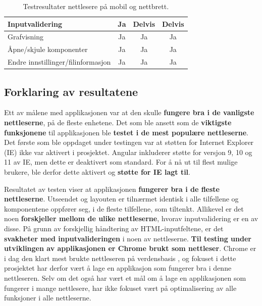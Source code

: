 \begin{table}[H]
{\begin{tabular}{|l|c|c|c|}
Inputvalidering & 
\cellcolor[HTML]{2ECC40}Ja & 
\cellcolor[HTML]{FFDC00}Delvis &
\cellcolor[HTML]{FFDC00}Delvis \\ \hline

Grafvisning & 
\cellcolor[HTML]{2ECC40}Ja & 
\cellcolor[HTML]{2ECC40}Ja & 
\cellcolor[HTML]{2ECC40}Ja \\ \hline

Åpne/skjule komponenter & 
\cellcolor[HTML]{2ECC40}Ja & 
\cellcolor[HTML]{2ECC40}Ja & 
\cellcolor[HTML]{2ECC40}Ja \\ \hline

Endre innstillinger/filinformasjon & 
\cellcolor[HTML]{2ECC40}Ja & 
\cellcolor[HTML]{2ECC40}Ja & 
\cellcolor[HTML]{2ECC40}Ja \\ \hline
\end{tabular}
}
\caption{Testresultater nettlesere på mobil og nettbrett.}
\end{table}

\subsection{Forklaring av resultatene}
Ett av målene med applikasjonen var at den skulle \textbf{fungere bra i de vanligste nettleserne}, på de fleste enhetene. Det som ble ansett som de \textbf{viktigste funksjonene} til applikasjonen ble \textbf{testet i de mest populære nettleserne}. Det første som ble oppdaget under testingen var at støtten for Internet Explorer (IE) ikke var aktivert i prosjektet. Angular inkluderer støtte for versjon 9, 10 og 11 av IE, men dette er deaktivert som standard. For å nå ut til flest mulige brukere, ble derfor dette aktivert og \textbf{støtte for IE lagt til}.

Resultatet av testen viser at applikasjonen \textbf{fungerer bra i de fleste nettleserne}. Utseendet og layouten er tilnærmet identisk i alle tilfellene og komponentene oppfører seg, i de fleste tilfellene, som tiltenkt. Allikevel er det noen \textbf{forskjeller mellom de ulike nettleserne}, hvorav inputvalidering er en av disse. På grunn av forskjellig håndtering av HTML-inputfeltene, er det \textbf{svakheter med inputvalideringen} i noen av nettleserne. \textbf{Til testing under utviklingen av applikasjonen er Chrome brukt som nettleser}. Chrome er i dag den klart mest brukte nettleseren på verdensbasis \cite{browserStats}, og fokuset i dette prosjektet har derfor vært å lage en applikasjon som fungerer bra i denne nettleseren. Selv om det også har vært et mål om å lage en applikasjonen som fungerer i mange nettlesere, har ikke fokuset vært på optimalisering av alle funksjoner i alle nettleserne.

